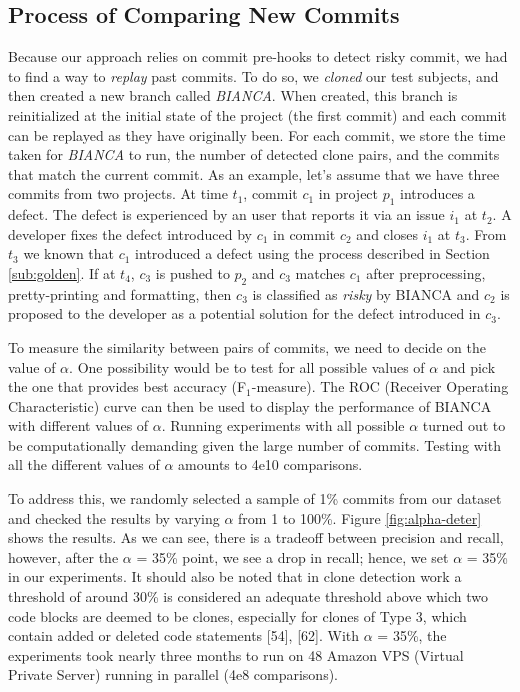 \documentclass[conference]{IEEEtran}
\begin{document}
\subsection{Process of Comparing New Commits}\label{sec:newcommits}

Because our approach relies on commit pre-hooks to detect risky commit,
we had to find a way to \emph{replay} past commits. To do so, we
\emph{cloned} our test subjects, and then created a new branch called
\emph{BIANCA}. When created, this branch is reinitialized at the initial
state of the project (the first commit) and each commit can be replayed
as they have originally been. For each commit, we store the time taken
for \emph{BIANCA} to run, the number of detected clone pairs, and the
commits that match the current commit. As an example, let's assume that
we have three commits from two projects. At time $t_1$, commit $c_1$ in
project $p_1$ introduces a defect. The defect is experienced by an user
that reports it via an issue $i_1$ at $t_2$. A developer fixes the
defect introduced by $c_1$ in commit $c_2$ and closes $i_1$ at $t_3$.
From $t_3$ we known that $c_1$ introduced a defect using the process
described in Section \ref{sub:golden}. If at $t_4$, $c_3$ is pushed to
$p_2$ and $c_3$ matches $c_1$ after preprocessing, pretty-printing and
formatting, then $c_3$ is classified as \emph{risky} by BIANCA and $c_2$
is proposed to the developer as a potential solution for the defect
introduced in $c_3$.



To measure the similarity between pairs of commits, we need to decide on
the value of $\alpha$. One possibility would be to test for all possible
values of $\alpha$ and pick the one that provides best accuracy
(F$_1$-measure). The ROC (Receiver Operating Characteristic) curve can
then be used to display the performance of BIANCA with different values
of $\alpha$. Running experiments with all possible $\alpha$ turned out
to be computationally demanding given the large number of commits.
Testing with all the different values of $\alpha$ amounts to 4e10
comparisons.

To address this, we randomly selected a sample of 1\% commits from our
dataset and checked the results by varying $\alpha$ from 1 to 100\%.
Figure \ref{fig:alpha-deter} shows the results. As we can see, there is
a tradeoff between precision and recall, however, after the $\alpha$ =
35\% point, we see a drop in recall; hence, we set $\alpha$ = 35\% in
our experiments. It should also be noted that in clone detection work a
threshold of around 30\% is considered an adequate threshold above which
two code blocks are deemed to be clones, especially for clones of Type
3, which contain added or deleted code statements {[}54{]}, {[}62{]}.
With $\alpha$ = 35\%, the experiments took nearly three months to run on
48 Amazon VPS (Virtual Private Server) running in parallel (4e8
comparisons).
\end{document}
